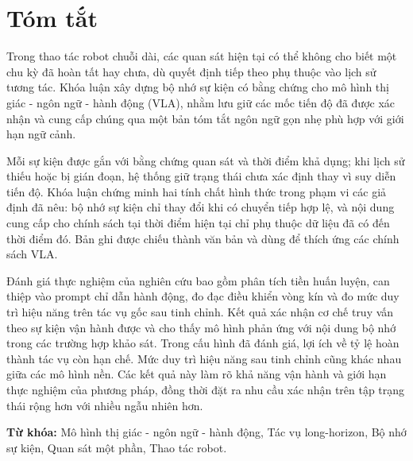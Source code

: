 \chapter*{Tóm tắt}
\thispagestyle{empty}

Trong thao tác robot chuỗi dài, các quan sát hiện tại có thể không cho biết một chu kỳ đã hoàn tất hay chưa, dù quyết định tiếp theo phụ thuộc vào lịch sử tương tác. Khóa luận xây dựng bộ nhớ sự kiện có bằng chứng cho mô hình thị giác - ngôn ngữ - hành động (VLA), nhằm lưu giữ các mốc tiến độ đã được xác nhận và cung cấp chúng qua một bản tóm tắt ngôn ngữ gọn nhẹ phù hợp với giới hạn ngữ cảnh.

Mỗi sự kiện được gắn với bằng chứng quan sát và thời điểm khả dụng; khi lịch sử thiếu hoặc bị gián đoạn, hệ thống giữ trạng thái chưa xác định thay vì suy diễn tiến độ. Khóa luận chứng minh hai tính chất hình thức trong phạm vi các giả định đã nêu: bộ nhớ sự kiện chỉ thay đổi khi có chuyển tiếp hợp lệ, và nội dung cung cấp cho chính sách tại thời điểm hiện tại chỉ phụ thuộc dữ liệu đã có đến thời điểm đó. Bản ghi được chiếu thành văn bản và dùng để thích ứng các chính sách VLA.

Đánh giá thực nghiệm của nghiên cứu bao gồm phân tích tiền huấn luyện, can thiệp vào prompt chỉ dẫn hành động, đo đạc điều khiển vòng kín và đo mức duy trì hiệu năng trên tác vụ gốc sau tinh chỉnh. Kết quả xác nhận cơ chế truy vấn theo sự kiện vận hành được và cho thấy mô hình phản ứng với nội dung bộ nhớ trong các trường hợp khảo sát. Trong cấu hình đã đánh giá, lợi ích về tỷ lệ hoàn thành tác vụ còn hạn chế. Mức duy trì hiệu năng sau tinh chỉnh cũng khác nhau giữa các mô hình nền. Các kết quả này làm rõ khả năng vận hành và giới hạn thực nghiệm của phương pháp, đồng thời đặt ra nhu cầu xác nhận trên tập trạng thái rộng hơn với nhiều ngẫu nhiên hơn.

\textbf{Từ khóa:} Mô hình thị giác - ngôn ngữ - hành động, Tác vụ long-horizon, Bộ nhớ sự kiện, Quan sát một phần, Thao tác robot.

